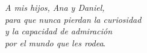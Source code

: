 

\vspace*{3cm} %

\begin{flushright}
	\emph{A mis hijos, Ana y Daniel,\\
		para que nunca pierdan la curiosidad\\
		y la capacidad de admiración\\
		por el mundo que les rodea\includegraphics[width=0.004\textwidth]{./figuras/ai_ml_dl_gai.png}}
\end{flushright}



